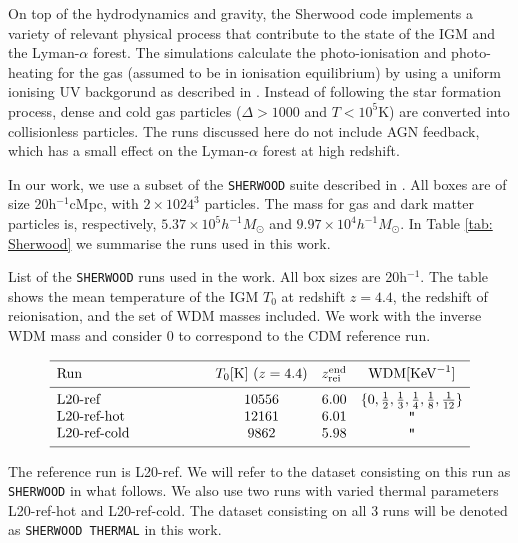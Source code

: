 On top of the hydrodynamics and gravity, the Sherwood code implements a variety of relevant physical process that contribute to the state of the IGM and the Lyman-$\alpha$ forest. The simulations calculate the photo-ionisation and photo-heating for the gas (assumed to be in ionisation equilibrium) by using a uniform ionising UV backgorund as described in \cite{Haardt2012}. Instead of following the star formation process, dense and cold gas particles ($\Delta>1000$ and $T<10^5$K) are converted into collisionless particles. The runs discussed here do not include AGN feedback, which has a small effect on the Lyman-$\alpha$ forest at high redshift.

In our work, we use a subset of the \texttt{SHERWOOD} suite described in \cite{sherwood_wdm}. All boxes are of size 20h$^{-1}$cMpc, with $2\times 1024^3$ particles. The mass for gas and dark matter particles is, respectively, $5.37\times 10^5h^{-1}M_\odot$ and $9.97\times 10^4h^{-1}M_\odot$. In Table \ref{tab: Sherwood} we summarise the runs used in this work.


\begin{table}
        \caption[]{List of the \texttt{SHERWOOD} runs used in the work.
        All box sizes are 20h$^{-1}$. The table shows the mean temperature of the IGM $T_0$ at redshift $z=4.4$, the redshift of reionisation, and the set of WDM masses included. We work with the inverse WDM mass and consider 0 to correspond to the CDM reference run.}
           \label{tab: Sherwood}
       $$ 
           \begin{array}{p{0.3\linewidth}ccc}
              \hline
              \noalign{\smallskip}
              Run      &  T_0 {[\mathrm{K}]}\ (z=4.4) &z_\mathrm{rei}^\mathrm{end}& \mathrm{WDM} [\mathrm{KeV}^{-1}] \\ 
              \noalign{\smallskip}
              \hline
              \noalign{\smallskip}
              L20-ref & 10556 &6.00&\{0,\frac{1}{2}, \frac{1}{3}, \frac{1}{4}, \frac{1}{8}, \frac{1}{12} \}     \\
              L20-ref-hot           & 12161&6.01  &\texttt{"}\\
              L20-ref-cold     & 9862  &5.98&       \texttt{"}     \\
              \noalign{\smallskip}
              \hline
           \end{array}
       $$ 
     \end{table}
The reference run is L20-ref. We will refer to the dataset consisting on this run as \texttt{SHERWOOD} in what follows. We also use two runs with varied thermal parameters L20-ref-hot and L20-ref-cold. The dataset consisting on all 3 runs will be denoted as \texttt{SHERWOOD THERMAL} in this work.

